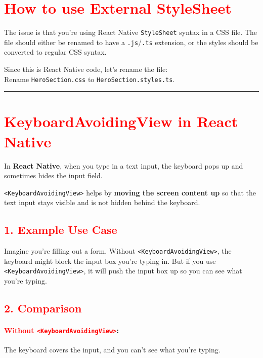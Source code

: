 \documentclass[12pt]{article}
\begin{document}
\section*{\textcolor{red}{\textbf{How to use External StyleSheet}}}

The issue is that you're using React Native \texttt{StyleSheet} syntax in a CSS file. The file should either be renamed to have a \texttt{.js}/\texttt{.ts} extension, or the styles should be converted to regular CSS syntax.

\begin{tcolorbox}[colback=gray!10, colframe=gray!80, sharp corners=all, boxrule=0.5pt]
Since this is React Native code, let's rename the file: \\
Rename \texttt{HeroSection.css} to \texttt{HeroSection.styles.ts}.
\end{tcolorbox}

\hrule
\vspace{0.5em}

\section*{\textcolor{red}{\textbf{KeyboardAvoidingView in React Native}}}

In \textbf{React Native}, when you type in a text input, the keyboard pops up and sometimes hides the input field.  

\texttt{<KeyboardAvoidingView>} helps by \textbf{moving the screen content up} so that the text input stays visible and is not hidden behind the keyboard.

\subsection*{\textcolor{red}{1. Example Use Case}}

Imagine you're filling out a form. Without \texttt{<KeyboardAvoidingView>}, the keyboard might block the input box you're typing in. But if you use \texttt{<KeyboardAvoidingView>}, it will push the input box up so you can see what you're typing.

\subsection*{\textcolor{red}{2. Comparison}}

\paragraph{\textcolor{red}{Without \texttt{<KeyboardAvoidingView>}}:}  
The keyboard covers the input, and you can’t see what you're typing.
\end{document}
